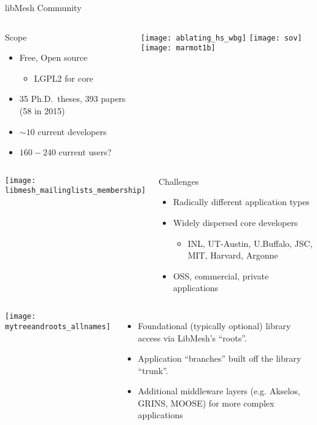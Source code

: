 \begin{frame}{libMesh Community}
\begin{columns}
\begin{block}{Scope}
\begin{itemize}
\item Free, Open source
\begin{itemize}
\item LGPL2 for core
\end{itemize}
\item 35 Ph.D.\ theses, 393 papers (58 in 2015)
\item $\sim10$ current developers
\item $160-240$ current users?
\end{itemize}
\end{block}

\texttt{[image: ablating\_hs\_wbg]}
\texttt{[image: sov]}
\texttt{[image: marmot1b]}
\end{columns}

\begin{columns}
\texttt{[image: libmesh\_mailinglists\_membership]}

\begin{block}{Challenges}
\begin{itemize}
\item Radically different application types
\item Widely dispersed core developers
\begin{itemize}
\item INL, UT-Austin, U.Buffalo, JSC, MIT, Harvard, Argonne
\end{itemize}
\item OSS, commercial, private applications
\end{itemize}
\end{block}
\end{columns}

\end{frame}


\begin{frame}[t]
  \begin{columns}
    \begin{center}
      \texttt{[image: mytreeandroots\_allnames]}
    \end{center}
    \begin{itemize}
      \item Foundational (typically optional) library access via LibMesh's ``roots''.
      \item Application ``branches'' built off the library ``trunk''.
      \item Additional middleware layers (e.g. Akselos, GRINS, MOOSE) for more complex applications
    \end{itemize}
  \end{columns}

\end{frame}




